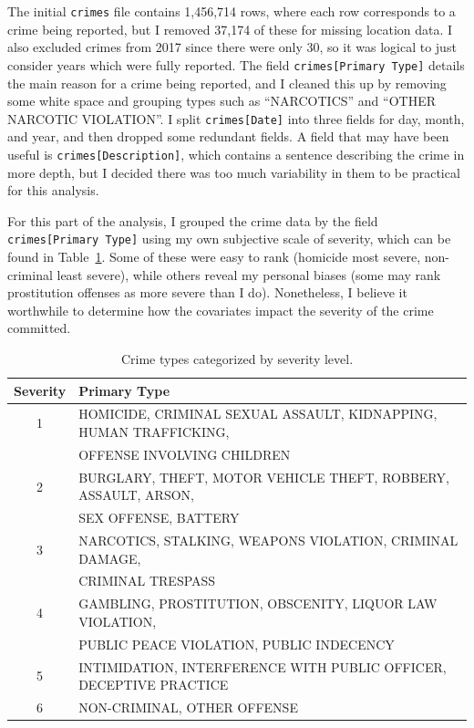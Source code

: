 \documentclass[11pt]{article}
\newcommand{\1}{\mathds{1}}
\def\code#1{\texttt{#1}}
\begin{document}
The initial \code{crimes} file contains 1,456,714 rows, where each row corresponds to a crime being reported, but I removed 37,174 of these for missing location data. I also excluded crimes from 2017 since there were only 30, so it was logical to just consider years which were fully reported. The field \code{crimes[Primary Type]} details the main reason for a crime being reported, and I cleaned this up by removing some white space and grouping types such as ``NARCOTICS'' and ``OTHER NARCOTIC VIOLATION''. I split \code{crimes[Date]} into three fields for day, month, and year, and then dropped some redundant fields. A field that may have been useful is \code{crimes[Description]}, which contains a sentence describing the crime in more depth, but I decided there was too much variability in them to be practical for this analysis.

For this part of the analysis, I grouped the crime data by the field \code{crimes[Primary Type]} using my own subjective scale of severity, which can be found in Table~\ref{tab:severity}. Some of these were easy to rank (homicide most severe, non-criminal least severe), while others reveal my personal biases (some may rank prostitution offenses as more severe than I do). Nonetheless, I believe it worthwhile to determine how the covariates impact the severity of the crime committed.

\begin{table}[h]
	\small
	{\begin{tabular}{cl} \toprule
		\textbf{Severity} & \textbf{Primary Type} \\ \midrule
		1 & HOMICIDE, CRIMINAL SEXUAL ASSAULT, KIDNAPPING, HUMAN TRAFFICKING, \\
		  & OFFENSE INVOLVING CHILDREN \\ 
		2 & BURGLARY, THEFT, MOTOR VEHICLE THEFT, ROBBERY, ASSAULT, ARSON, \\
		  & SEX OFFENSE, BATTERY \\ 
		3 & NARCOTICS, STALKING, WEAPONS VIOLATION, CRIMINAL DAMAGE, \\
		  & CRIMINAL TRESPASS \\
		4 & GAMBLING, PROSTITUTION, OBSCENITY, LIQUOR LAW VIOLATION, \\
		  & PUBLIC PEACE VIOLATION, PUBLIC INDECENCY \\
		5 & INTIMIDATION, INTERFERENCE WITH PUBLIC OFFICER, DECEPTIVE PRACTICE \\
		6 & NON-CRIMINAL, OTHER OFFENSE \\ \bottomrule
	\end{tabular}} 
	\caption{Crime types categorized by severity level.}
	\label{tab:severity}
\end{table}
\end{document}
